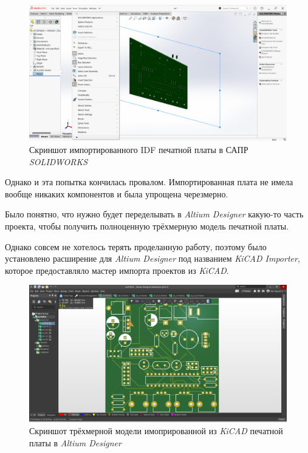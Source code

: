 \begin{figure}[h]
  \centering
  \includegraphics[scale=0.2]{../img/scrot/Screenshot-2024-05-06-175849.png}
  \caption{Скриншот импортированного IDF печатной платы в САПР \textit{SOLIDWORKS}}
\end{figure}

Однако и эта попытка кончилась провалом. Импортированная плата не имела вообще никаких компонентов и была упрощена черезмерно.

Было понятно, что нужно будет переделывать в \textit{Altium Designer} какую-то часть проекта, чтобы получить полноценную трёхмерную модель печатной платы.

Однако совсем не хотелось терять проделанную работу, поэтому было установлено расширение для \textit{Altium Designer} под названием \textit{KiCAD Importer}, которое предоставляло мастер импорта проектов из \textit{KiCAD}.

\begin{figure}[h]
  \centering
  \includegraphics[scale=0.2]{../img/scrot/Screenshot-2024-05-08-110214.png}
  \caption{Скриншот трёхмерной модели имопрированной из \textit{KiCAD} печатной платы в \textit{Altium Designer}}

\end{figure}

